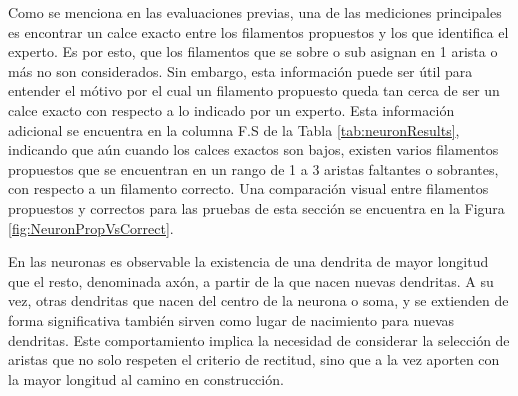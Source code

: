 Como se menciona en las evaluaciones previas, una de las mediciones principales es encontrar un calce exacto entre los filamentos propuestos y los que identifica el experto. Es por esto, que los filamentos que se sobre o sub asignan en 1 arista o m\'as no son considerados. Sin embargo, esta informaci\'on puede ser \'util para entender el m\'otivo por el cual un filamento propuesto queda tan cerca de ser un calce exacto con respecto a lo indicado por un experto. Esta informaci\'on adicional se encuentra en la columna F.S de la Tabla \ref{tab:neuronResults}, indicando que a\'un cuando los calces exactos son bajos, existen varios filamentos propuestos que se encuentran en un rango de 1 a 3 aristas faltantes o sobrantes, con respecto a un filamento correcto. Una comparaci\'on visual entre filamentos propuestos y correctos para las pruebas de esta secci\'on se encuentra en la Figura \ref{fig:NeuronPropVsCorrect}.

En las neuronas es observable la existencia de una dendrita de mayor longitud que el resto, denominada axón, a partir de la que nacen nuevas dendritas. A su vez, otras dendritas que nacen del centro de la neurona o soma, y se extienden de forma significativa tambi\'en sirven como lugar de nacimiento para nuevas dendritas. Este comportamiento implica la necesidad de considerar la selecci\'on de aristas que no solo respeten el criterio de rectitud, sino que a la vez aporten con la mayor longitud al camino en construcci\'on.


